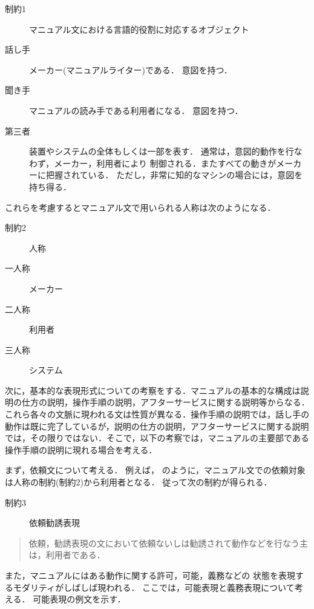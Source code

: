 \begin{description}
\item[制約1] マニュアル文における言語的役割に対応するオブジェクト
\item[話し手] メーカー(マニュアルライター)である．
            意図を持つ．
\item[聞き手] マニュアルの読み手である利用者になる．
            意図を持つ．
\item[第三者] 装置やシステムの全体もしくは一部を表す．
                通常は，意図的動作を行なわず，メーカー，利用者により
                制御される．またすべての動きがメーカーに把握されている．
                ただし，非常に知的なマシンの場合には，意図を持ち得る．
\end{description}
これらを考慮するとマニュアル文で用いられる人称は次のようになる．
\begin{description}
\item[制約2] 人称 
\item[一人称] メーカー 
\item[二人称] 利用者   
\item[三人称] システム 
\end{description}

次に，基本的な表現形式についての考察をする．マニュアルの基本的な構成は説
明の仕方の説明，操作手順の説明，アフターサービスに関する説明等からなる．
これら各々の文脈に現われる文は性質が異なる．操作手順の説明では，話し手の
動作は既に完了しているが，説明の仕方の説明，アフターサービスに関する説明
では，その限りではない．そこで，以下の考察では，マニュアルの主要部である
操作手順の説明に現れる場合を考える．

まず，依頼文について考える．
例えば，
のように，マニュアル文での依頼対象は人称の制約(制約2)から利用者となる．
従って次の制約が得られる．
\begin{description}
\item[制約3] 依頼勧誘表現
\end{description}
\begin{quote}
依頼，勧誘表現の文において依頼ないしは勧誘されて動作などを行なう{\dg 主}は，利用者である．
\end{quote}

また，マニュアルにはある動作に関する許可，可能，義務などの
状態を表現するモダリティがしばしば現われる．
ここでは，可能表現と義務表現について考える．
可能表現の例文を示す．

